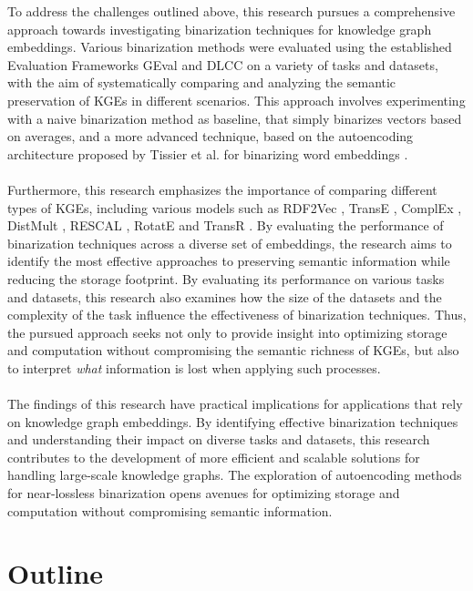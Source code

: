 \documentclass[11pt,titlepage,oneside,openany]{book}
\begin{document}
To address the challenges outlined above, this research pursues a comprehensive approach towards investigating binarization techniques for knowledge graph embeddings. Various binarization methods were evaluated using the established Evaluation Frameworks GEval \cite{pellegrino_geval_2020, pellegrino_configurable_2019} and DLCC \cite{portisch_dlcc_2022} on a variety of tasks and datasets, with the aim of systematically comparing and analyzing the semantic preservation of KGEs in different scenarios. This approach involves experimenting with a naive binarization method as baseline, that simply binarizes vectors based on averages, and a more advanced technique, based on the autoencoding architecture proposed by Tissier et al. for binarizing word embeddings \cite{tissier_near-lossless_2019}.\\
\\
Furthermore, this research emphasizes the importance of comparing different types of KGEs, including various models such as RDF2Vec \cite{ristoski_rdf2vec_2019}, TransE \cite{bordes_translating_2013}, ComplEx \cite{trouillon_complex_2016}, DistMult \cite{yang_embedding_2014}, RESCAL \cite{nickel_three-way_2011}, RotatE \cite{sun_rotate_2019} and TransR \cite{lin_learning_2015}. By evaluating the performance of binarization techniques across a diverse set of embeddings, the research aims to identify the most effective approaches to preserving semantic information while reducing the storage footprint. By evaluating its performance on various tasks and datasets, this research also examines how the size of the datasets and the complexity of the task influence the effectiveness of binarization techniques. Thus, the pursued approach seeks not only to provide insight into optimizing storage and computation without compromising the semantic richness of KGEs, but also to interpret \textit{ what} information is lost when applying such processes.\\
\\
The findings of this research have practical implications for applications that rely on knowledge graph embeddings. By identifying effective binarization techniques and understanding their impact on diverse tasks and datasets, this research contributes to the development of more efficient and scalable solutions for handling large-scale knowledge graphs. The exploration of autoencoding methods for near-lossless binarization opens avenues for optimizing storage and computation without compromising semantic information.

\section{Outline}
\end{document}
